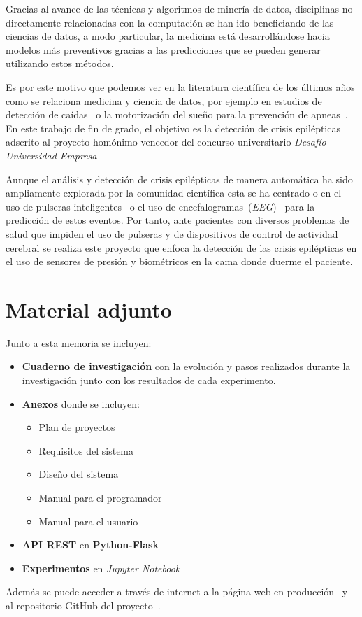 
Gracias al avance de las técnicas y algoritmos de minería de datos, disciplinas no directamente relacionadas con la computación se han ido beneficiando de las ciencias de datos, a modo particular, la medicina está desarrollándose hacia modelos más preventivos gracias a las predicciones que se pueden generar utilizando estos métodos.

Es por este motivo que podemos ver en la literatura científica de los últimos años como se relaciona medicina y ciencia de datos, por ejemplo en estudios de detección de caídas~\cite{tolkiehn2011fall} o la motorización del sueño para la prevención de apneas~\cite{kortelainen2012sleepmonitoring}. En este trabajo de fin de grado, el objetivo es la detección de crisis epilépticas adscrito al proyecto homónimo vencedor del concurso universitario \textit{Desafío Universidad Empresa}~\cite{radio:radio_amiga_burgos_2018}

Aunque el análisis y detección de crisis epilépticas de manera automática ha sido ampliamente explorada por la comunidad científica esta se ha centrado o en el uso de pulseras inteligentes~\cite{ramgopal2014product_review} o el uso de encefalogramas~(\textit{EEG})~\cite{jeppesen2017modified,kumar2014epilepticeeg,tzallas2012review} para la predicción de estos eventos. Por tanto, ante pacientes con diversos problemas de salud que impiden el uso de pulseras y de dispositivos de control de actividad cerebral se realiza este proyecto que enfoca la detección de las crisis epilépticas en el uso de sensores de presión y biométricos en la cama donde duerme el paciente.

\section{Material adjunto}
Junto a esta memoria se incluyen:

\begin{itemize}
	\item \textbf{Cuaderno de investigación} con la evolución y pasos realizados durante la investigación junto con los resultados de cada experimento.
	\item \textbf{Anexos} donde se incluyen:
		\begin{itemize}
			\item Plan de proyectos
			\item Requisitos del sistema
			\item Diseño del sistema
			\item Manual para el programador
			\item Manual para el usuario
		\end{itemize}
	\item \textbf{API REST} en \textbf{Python-Flask}
	\item \textbf{Experimentos} en \textit{Jupyter Notebook}
\end{itemize}

Además se puede acceder a través de internet a la página web en producción~\cite{garrido2019web} y al repositorio GitHub del proyecto~\cite{garrido2019repo}.